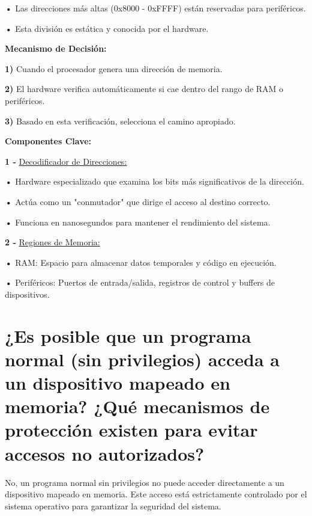 \documentclass{article}
\begin{document}
\textbf{    •} { Las direcciones más altas (0x8000 - 0xFFFF) están reservadas para periféricos.}

\textbf{    •} { Esta división es estática y conocida por el hardware.}

\quad

\textbf{Mecanismo de Decisión: }

\quad

\textbf{1)  } {Cuando el procesador genera una dirección de memoria.}

\textbf{2)  } {El hardware verifica automáticamente si cae dentro del rango de RAM o periféricos.}

\textbf{3)  } {Basado en esta verificación, selecciona el camino apropiado.}

\quad

\textbf{Componentes Clave: }

\quad

\textbf{1 -  } {\underline{Decodificador de Direcciones: }}

\quad

\textbf{    •} { Hardware especializado que examina los bits más significativos de la dirección.}

\textbf{    •} { Actúa como un "conmutador" que dirige el acceso al destino correcto.}

\textbf{    •} { Funciona en nanosegundos para mantener el rendimiento del sistema.}

\quad

\textbf{2 -  } {\underline{Regiones de Memoria: }}

\quad

\textbf{    •} { RAM: Espacio para almacenar datos temporales y código en ejecución.}

\textbf{    •} { Periféricos: Puertos de entrada/salida, registros de control y buffers de dispositivos.}

\quad
\newpage






\section{¿Es posible que un programa normal (sin privilegios) acceda a un dispositivo mapeado en memoria? ¿Qué mecanismos de protección existen para evitar accesos no autorizados?}

\quad

{No, un programa normal sin privilegios no puede acceder directamente a un dispositivo mapeado en memoria. Este acceso está estrictamente controlado por el sistema operativo para garantizar la seguridad del sistema.}
\end{document}

